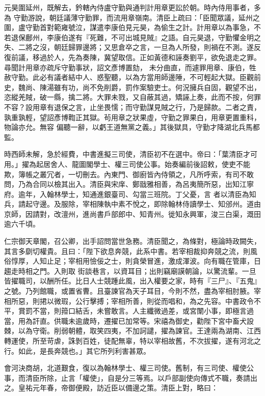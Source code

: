 \begin{pinyinscope}
 元昊圍延州，既解去，鈐轄內侍盧守勤與通判計用章更訟於朝。時內侍用事者，多為
 守勤游說，朝廷議薄守勤罪，而流用章嶺南。清臣上疏曰：「臣聞眾議，延州之圍，盧守勤首對範雍號泣，謀遣李康伯見元昊，為偷生之計。計用章以為事急，不若退保鄜州，李康伯遂有『死難，不可出城見賊』之語。自元昊退，守勤懼金明之失、二將之沒，朝廷歸罪邊將；又思倉卒之言，一旦為人所發，則禍在不測。遂反復前議，移過於人，先為奏陳，冀望取信。正如黃德和誣奏劉平，欲免退走之罪。尋聞計用章亦疏斥守勤事狀，詔文彥博置劾，
 未分曲直，而遽罪用章、康伯，牲赦守勤。此必有議者結中人、惑聖聽，以為方當用師邊陲，不可輕起大獄。臣觀前史，魏尚、陳湯雖有功，尚不免削爵，罰作案驗吏士。何況擁兵自固，觀望不出，恣縱羌賊，破一縣，擒二將。大罪未戮，又自蔽其過，矯誣上奏，此而不按，何罪不容？設用章有退保之言，止坐畏懦；而守勤謀見賊之行，乃是歸款。二者之責，孰重孰輕，望詔彥博鞫正其獄。茍用章之狀果虛，守勤之罪果白，用章更置重科，物論亦允。無容
 偏聽一辭，以虧王道無黨之義。」其後獄具，守勤才降湖北兵馬都監。



 時西師未解，急於經費，中書進擬三司使，清臣初不在選中。帝曰：「葉清臣才可用。」擢為起居舍人、龍圖閣學士、權三司使公事。始奏編前後詔敕，使吏不能欺，簿帳之叢冗者，一切刪去。內東門、御廚皆內侍領之，凡所呼索，有司不敢問，乃為合同以檢其出入。清臣與宋庠、鄭戩雅相善，為呂夷簡所惡，出知江寧府。逾年，入翰林學士，知通進銀臺司、勾當三班院。丁父憂，言
 者以清臣為知兵，請起守邊。及服除，宰相陳執中素不悅之，即除翰林侍讀學士、知邠州。道由京師，因請對，改澶州，進尚書戶部郎中、知青州。徙知永興軍，浚三白渠，溉田逾六千頃。



 仁宗御天章閣，召公卿，出手詔問當世急務。清臣聞之，為條對，極論時政闕失，其言多劘切權貴。且曰：「陛下欲息奔競，此系中書。若宰相裁抑奔競之流，則風俗惇厚，人知止足；宰相用憸佞之士，則貪榮冒進，激成渾波。向有職在管庫，日趨走時相之門。入則取
 街談巷言，以資耳目；出則竊廟謨朝論，以驚流輩。一旦皆擢職司，以酬所任。比日人士競踵此風，出入權要之家，時有『三尸』、『五鬼』之號。乃列館職，或置省曹。且臺諫官為天子耳目，今則不然，盡為宰相肘腋。宰相所惡，則捃以微瑕，公行擊搏；宰相所善，則從而唱和，為之先容。中書政令不平，賞罰不當，則箝口結舌，未嘗敢言。人主纖微過差，或宮闈小事，即極言過當，用為訐直。供職未逾歲時，遷擢已加常等。宋禧為御史，勸陛下宮中畜犬設
 棘，以為守衛。削弱朝體，取笑四夷，不加訶譴，擢為諫官。王達兩為湖南、江西轉運使，所至苛虐，誅剝百姓，徒配無辜，特以宰相故舊，不次拔擢，遂有河北之行。如此，是長奔競也。」其它所列利害甚眾。



 會河決商胡，北道艱食，復以為翰林學士、權三司使。舊制，有三司使、權使公事，而清臣所除，止言「權使」，自是分三等焉。以戶部副使向傳式不職，奏請出之。皇祐元年春，帝御便殿，訪近臣以備邊之策。清臣上對，略曰：




\end{pinyinscope}
